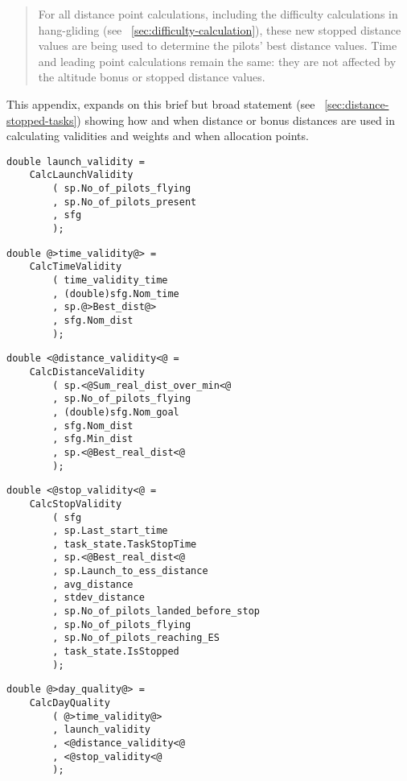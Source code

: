 \documentclass[gap.tex]{subfiles}
\begin{document}
\label{sec:bonus-distance-use}

\begin{quote}
    For all distance point calculations, including the difficulty calculations
    in hang-gliding (see ~\ref{sec:difficulty-calculation}), these new stopped
    distance values are being used to determine the pilots’ best distance
    values.  Time and leading point calculations remain the same: they are not
    affected by the altitude bonus or stopped distance values. 
\end{quote}

This appendix, expands on this brief but broad statement (see
~\ref{sec:distance-stopped-tasks}) showing how and when distance or bonus
distances are used in calculating validities and weights and when allocation
points.

\begin{lstlisting}[style=base, caption={Launch Validity doesn't depend on distance inputs.}]
double launch_validity =
    CalcLaunchValidity
        ( sp.No_of_pilots_flying
        , sp.No_of_pilots_present
        , sfg
        );
\end{lstlisting}

\begin{lstlisting}[style=base, caption={Time Validity depends on \textcolor{red}{bonus} distance input.}]
double @>time_validity@> =
    CalcTimeValidity
        ( time_validity_time
        , (double)sfg.Nom_time
        , sp.@>Best_dist@>
        , sfg.Nom_dist
        );
\end{lstlisting}

\begin{lstlisting}[style=base, caption={Distance Validity depends on \textcolor{blue}{real} distance inputs.}]
double <@distance_validity<@ =
    CalcDistanceValidity
        ( sp.<@Sum_real_dist_over_min<@
        , sp.No_of_pilots_flying
        , (double)sfg.Nom_goal
        , sfg.Nom_dist
        , sfg.Min_dist
        , sp.<@Best_real_dist<@
        );
\end{lstlisting}

\begin{lstlisting}[style=base, caption={Stop Validity depends on \textcolor{blue}{real} distance inputs.}]
double <@stop_validity<@ =
    CalcStopValidity
        ( sfg
        , sp.Last_start_time
        , task_state.TaskStopTime
        , sp.<@Best_real_dist<@
        , sp.Launch_to_ess_distance
        , avg_distance
        , stdev_distance
        , sp.No_of_pilots_landed_before_stop
        , sp.No_of_pilots_flying
        , sp.No_of_pilots_reaching_ES
        , task_state.IsStopped
        );
\end{lstlisting}

\begin{lstlisting}[style=base, caption={Day Quality depends on \textcolor{red}{bonus} distance.}]
double @>day_quality@> =
    CalcDayQuality
        ( @>time_validity@>
        , launch_validity
        , <@distance_validity<@
        , <@stop_validity<@
        );
\end{lstlisting}
\end{document}

